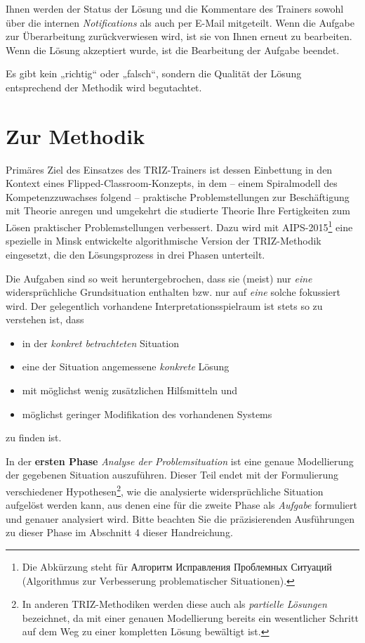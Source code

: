 \documentclass[11pt,a4paper]{article}
\begin{document}
Ihnen werden der Status der Lösung und die Kommentare des Trainers sowohl über
die internen \emph{Notifications} als auch per E-Mail mitgeteilt.  Wenn die
Aufgabe zur Überarbeitung zurückverwiesen wird, ist sie von Ihnen erneut zu
bearbeiten.  Wenn die Lösung akzeptiert wurde, ist die Bearbeitung der Aufgabe
beendet.

Es gibt kein „richtig“ oder „falsch“, sondern die Qualität der Lösung
entsprechend der Methodik wird begutachtet.

\section{Zur Methodik}

Primäres Ziel des Einsatzes des TRIZ-Trainers ist dessen Einbettung in den
Kontext eines Flipped-Classroom-Konzepts, in dem -- einem Spiralmodell des
Kompetenzzuwachses folgend -- praktische Problemstellungen zur Beschäftigung
mit Theorie anregen und umgekehrt die studierte Theorie Ihre Fertigkeiten zum
Lösen praktischer Problemstellungen verbessert. Dazu wird mit
AIPS-2015\footnote{Die Abkürzung steht für \foreignlanguage{russian}{Алгоритм
    Исправления Проблемных Ситуаций} (Algorithmus zur Verbesserung
  problematischer Situationen).}  eine spezielle in Minsk entwickelte
algorithmische Version der TRIZ-Methodik eingesetzt, die den Lösungsprozess in
drei Phasen unterteilt.

Die Aufgaben sind so weit heruntergebrochen, dass sie (meist) nur \emph{eine}
widersprüchliche Grundsituation enthalten bzw. nur auf \emph{eine} solche
fokussiert wird.  Der gelegentlich vorhandene Interpretationsspielraum ist
stets so zu verstehen ist, dass
\begin{itemize}[noitemsep]
\item in der \emph{konkret betrachteten} Situation
\item eine der Situation angemessene \emph{konkrete} Lösung
\item mit möglichst wenig zusätzlichen Hilfsmitteln und 
\item möglichst geringer Modifikation des vorhandenen Systems
\end{itemize}
zu finden ist. 

In der \textbf{ersten Phase} \emph{Analyse der Problemsituation} ist eine
genaue Modellierung der gegebenen Situation auszuführen.  Dieser Teil endet
mit der Formulierung verschiedener Hypothesen\footnote{In anderen
  TRIZ-Methodiken werden diese auch als \emph{partielle Lösungen} bezeichnet,
  da mit einer genauen Modellierung bereits ein wesentlicher Schritt auf dem
  Weg zu einer kompletten Lösung bewältigt ist.}, wie die analysierte
widersprüchliche Situation aufgelöst werden kann, aus denen eine für die
zweite Phase als \emph{Aufgabe} formuliert und genauer analysiert wird.  Bitte
beachten Sie die präzisierenden Ausführungen zu dieser Phase im Abschnitt 4
dieser Handreichung. 
\end{document}
